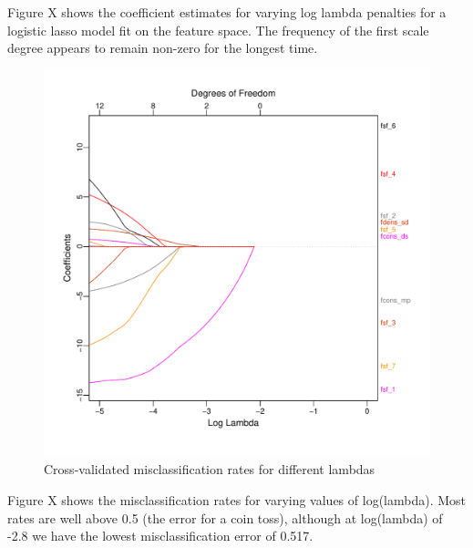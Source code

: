 \documentclass[12pt,twoside]{reedthesis}
\theoremstyle{definition}
\theoremstyle{definition}
\theoremstyle{definition}
\theoremstyle{remark}
\begin{document}
Figure X shows the coefficient estimates for varying log lambda
penalties for a logistic lasso model fit on the feature space. The
frequency of the first scale degree appears to remain non-zero for the
longest time.
\begin{figure}[h]
\centering
\includegraphics[scale = .5]{images/loglambda_f.pdf}
\caption{Cross-validated misclassification rates for different lambdas}
\label{subd}
\end{figure}
Figure X shows the misclassification rates for varying values of
log(lambda). Most rates are well above 0.5 (the error for a coin toss),
although at log(lambda) of -2.8 we have the lowest misclassification
error of 0.517.
\end{document}
